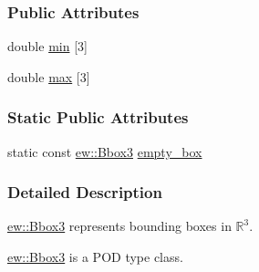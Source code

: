 \subsubsection*{Public Attributes}
\begin{DoxyCompactItemize}
\item 
double \hyperlink{classew_1_1Bbox3_a386445b5ea3806503e33993943843afc}{min} \mbox{[}3\mbox{]}
\item 
double \hyperlink{classew_1_1Bbox3_a33f29d6f0df32349cbfc36e441ee646d}{max} \mbox{[}3\mbox{]}
\end{DoxyCompactItemize}
\subsubsection*{Static Public Attributes}
\begin{DoxyCompactItemize}
\item 
static const \hyperlink{classew_1_1Bbox3}{ew::Bbox3} \hyperlink{classew_1_1Bbox3_ae34792fc91bdc9abaa9d17ee55936169}{empty\_\-box}
\end{DoxyCompactItemize}


\subsubsection{Detailed Description}
\hyperlink{classew_1_1Bbox3}{ew::Bbox3} represents bounding boxes in $\mathbb{R}^3$.

\hyperlink{classew_1_1Bbox3}{ew::Bbox3} is a POD type class. 

